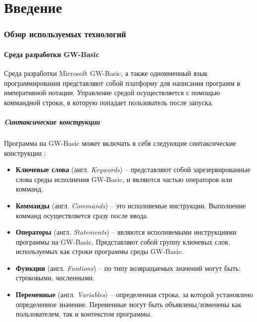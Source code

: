 \documentclass[12pt]{article}
\begin{document}
	\part*{\centering Введение}
	
	\newpage
	\section{Обзор используемых технологий}	
		\subsection{Среда разработки GW-Basic}
			\hspace{\parindent} Среда разработки Microsoft GW-Basic, а также одноименный язык программирования представляют собой платформу для написания программ в императивной нотации. 
			Управление средой осуществляется с помощью коммандной строки, в которую попадает пользователь после запуска.
			\subsubsection{Cинтаксические конструкции}
			\label{subsec:basicKeywords}
			\hspace{\parindent} Программа на GW-Basic может включать в себя следующие синтаксические конструкции \cite{basicManual}:
			\begin{itemize}
				\item {\bf Ключевые слова} (англ. {\it Keywords}) -- представляют собой зарезервированные слова среды исполнения GW-Basic, и являются частью операторов или комманд. 				
				\item {\bf Комманды} (англ. { \it Commands}) -- это исполняемые инструкции. Выполнение комманд осуществляется сразу после ввода.
				\item {\bf Операторы} (англ. {\it Statements}) -- являются исполняемыми инструкциями программы на GW-Basic. Представляют собой группу ключевых слов, используемых как строки программы среды GW-Basic.
				\item {\bf Функции} (англ. {\it Funtions}) -- по типу возвращаемых значений могут быть: строковыми, численными. 
				\item {\bf Переменные} (англ. {\it Variables}) -- определенная строка, за которой установлено определенное значение. Переменные могут быть объявлены/изменены как пользователем, так и контекстом программы.
			\end{itemize}
\end{document}
